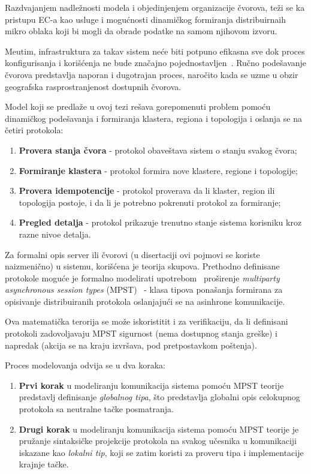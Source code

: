 Razdvajanjem nadle\v znosti modela i objedinjenjem organizacije \v cvorova, te\v zi se ka pristupu EC-a kao usluge i mogu\'cnosti dinami\v ckog formiranja distribuirnaih mikro oblaka koji bi mogli da obrade podatke na samom njihovom izvoru.

Me\dj utim, infrastruktura za takav sistem ne\'ce biti potpuno efikasna sve dok proces konfigurisanja i kori\v s\'cenja ne bude zna\v cajno pojednostavljen~\cite{SatyanarayananBCD09}. Ru\v cno pode\v savanje \v cvorova predstavlja naporan i dugotrajan proces, naro\v cito kada se uzme u obzir geografska rasprostranjenost dostupnih \v cvorova. 

Model koji se predla\v ze u ovoj tezi re\v sava gorepomenuti problem pomo\'cu  dinami\v ckog pode\v savanja i formiranja klastera, regiona i topologija i oslanja se na \v cetiri protokola:

\begin{enumerate}[start=1,label={(\bfseries \arabic*)}]
	\item \textbf{Provera stanja \v cvora} - protokol obave\v stava sistem o stanju svakog \v cvora; 
	\item \textbf{Formiranje klastera} - protokol formira nove klastere, regione i topologije;
	\item \textbf{Provera idempotencije} - protokol proverava da li klaster, region ili topologija postoje, i da li je potrebno pokrenuti protokol za formiranje;
	\item \textbf{Pregled detalja} - protokol prikazuje trenutno stanje sistema korisniku kroz razne nivoe detalja.
\end{enumerate}

Za formalni opis server ili \v cvorovi (u disertaciji ovi pojmovi se koriste naizmeni\v cno) u sistemu, kori\v s\'cena je teorija skupova. Prethodno definisane protokole mogu\'ce je formalno modelirati upotrebom~\cite{HuY17} pro\v sirenje \emph{multiparty asynchronous session types} (MPST)~\cite {HondaYC08} - klasa tipova pona\v sanja formirana za opisivanje distribuiranih protokola oslanjaju\'ci se na asinhrone komunikacije.

Ova matemati\v cka terorija se mo\v ze iskoristitit i za verifikaciju, da li definisani protokoli zadovoljavaju MPST sigurnost (nema dostupnog stanja gre\v ske) i napredak (akcija se na kraju izvr\v sava, pod pretpostavkom po\v stenja).

Proces modelovanja odvija se u dva koraka:

\begin{enumerate}[start=1,label={(\bfseries \arabic*)}]
	\item \textbf{Prvi korak} u modeliranju komunikacija sistema pomo\'cu MPST teorije predstavlj definisanje \emph{globalnog tipa}, \v sto predstavlja globalni opis celokupnog protokola sa neutralne ta\v cke posmatranja.
	\item \textbf{Drugi korak} u modeliranju komunikacija sistema pomo\'cu MPST teorije je pru\v zanje sintaksi\v cke projekcije protokola na svakog u\v cesnika u komunikaciji iskazane kao \emph{lokalni tip}, koji se zatim koristi za proveru tipa i implementacije krajnje ta\v cke.
\end{enumerate}

